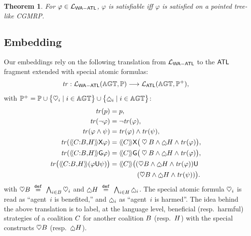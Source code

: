 \documentclass{article}
\newtheorem{theorem}{Theorem}
\begin{document}
\begin{theorem}\label{theorem: tree-like property}
  For $\varphi \in \mathcal{L}_{\mathsf{WA{-}ATL}} $,
  $\varphi$
      is satisfiable 
      iff $\varphi$
      is satisfied on a pointed tree-like CGMRP. 
\end{theorem}
\subsection{Embedding}\label{sec:embedding}


Our embeddings rely on the following translation from  $\mathcal{L}_{\mathsf{WA{-}ATL}}$ to the $\mathsf{ATL}$ fragment  extended with special atomic formulas:
\begin{align*}
\mathit{tr}:
\mathcal{L}_{\mathsf{WA{-}ATL}}(\mathbb{AGT}, \mathbb{P} ) \longrightarrow
\mathcal{L}_{\mathsf{ATL}}(\mathbb{AGT}, \mathbb{P}^+ ), 
\end{align*}
with $\AP^+ =\AP\cup  \big\{ \help_i \suchthat
i \in \AGT 
\big\}\cup  \big\{ \harm_i \suchthat
i \in \AGT 
\big\}$:
\begin{align*}
  \mathit{tr}(p ) &= p,\\
\mathit{tr}(\neg \varphi  ) &= \neg \mathit{tr}( \varphi  ),\\
\mathit{tr}( \varphi \wedge
\psi ) &=   \mathit{tr}( \varphi  ) \wedge \mathit{tr}( \psi   ) ,\\
\mathit{tr}( \atlbh{\Coalition}{\GroupB}{\GroupH}
\nexttime \varphi ) &=  \atlop{\Coalition} \nexttime \big(\help \GroupB \wedge \harm \GroupH \wedge \mathit{tr}( \varphi  ) \big) ,\\
\mathit{tr}( \atlbh{\Coalition}{\GroupB}{\GroupH}
\henceforth \varphi ) &=  \atlop{\Coalition}\G\big(\help \GroupB \wedge \harm \GroupH \wedge \mathit{tr}( \varphi  ) \big) ,\\
\mathit{tr}\big( \atlbh{\Coalition}{\GroupB}{\GroupH}
(\varphi\U\psi)  \big) &=  \atlop{\Coalition} \big ((\help \GroupB \wedge \harm \GroupH \wedge \mathit{tr}(\varphi))\U\\
&\qquad\qquad(\help \GroupB \wedge \harm \GroupH \wedge \mathit{tr}(\psi))  \big).
\end{align*}
 with $\mathbin{\heartsuit} B\ \stackrel{\mathtt{def}}{=} \  \bigwedge_{i \in B} \mathbin{\heartsuit}_i$ and $\harm \GroupH\eqdef \bigwedge_{i \in \GroupH} \harm_i$. The special atomic formula $\mathbin{\heartsuit}_i$ is read as ``agent~$i$ is benefited,'' and $\harm_i$ as ``agent~$i$ is harmed''.  
The idea behind the above translation is to label, at the language level, beneficial (resp.\ harmful) strategies of a coalition $C$ for another coalition $B$ (resp.\ $H$) with the special constructs $\mathbin{\heartsuit} B$ (resp.\ $\harm \GroupH$).
\end{document}
